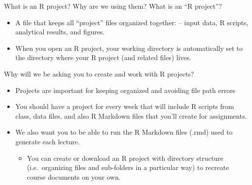 \documentclass[
  8pt,
  ignorenonframetext,
  dvipsnames]{beamer}
\providecommand{\tightlist}{%
  \setlength{\itemsep}{0pt}\setlength{\parskip}{0pt}}
\let\olditem\item
\renewcommand{\item}{%
  \olditem\vspace{4pt}
}
\begin{document}
\begin{frame}{What is an R project? Why are we using them?}
\protect\hypertarget{what-is-an-r-project-why-are-we-using-them}{}
What is an ``R project''?

\begin{itemize}
\tightlist
\item
  A file that keeps all ``project'' files organized together: -- input
  data, R scripts, analytical results, and figures.
\item
  When you open an R project, your working directory is automatically
  set to the directory where your R project (and related files) lives.
\end{itemize}

Why will we be asking you to create and work with R projects?

\begin{itemize}
\tightlist
\item
  Projects are important for keeping organized and avoiding file path
  errors
\item
  You should have a project for every week that will include R scripts
  from class, data files, and also R Markdown files that you'll create
  for assignments.
\item
  We also want you to be able to run the R Markdown files (.rmd) used to
  generate each lecture.

  \begin{itemize}
  \tightlist
  \item
    You can create or download an R project with directory structure
    (i.e.~organizing files and sub-folders in a particular way) to
    recreate course documents on your own.
  \end{itemize}
\end{itemize}
\end{frame}
\end{document}
